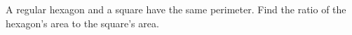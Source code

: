 A regular hexagon and a square have the same perimeter. Find the ratio of the hexagon's area to the square's area.
